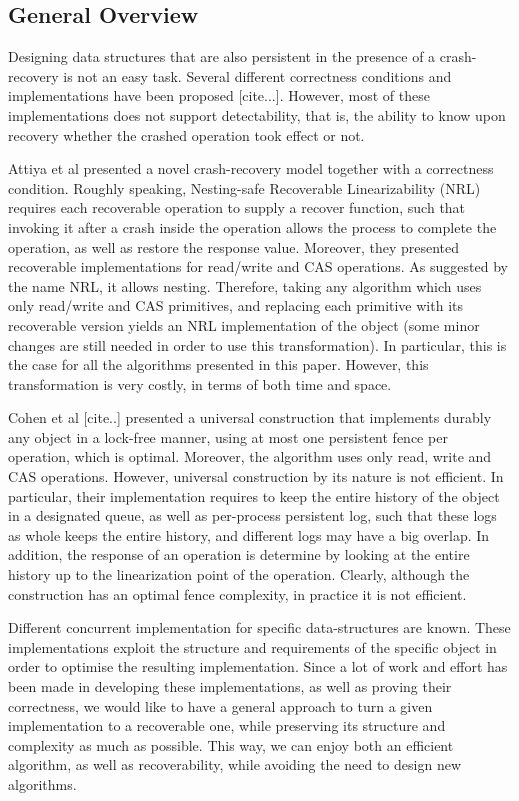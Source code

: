 \subsection{General Overview}
Designing data structures that are also persistent in the presence of a crash-recovery is not an easy task. Several different correctness conditions and implementations have been proposed [cite...]. However, most of these implementations does not support detectability, that is, the ability to know upon recovery whether the crashed operation took effect or not.

Attiya et al presented a novel crash-recovery model together with a correctness condition. Roughly speaking, Nesting-safe Recoverable Linearizability (NRL) requires each recoverable operation to supply a recover function, such that invoking it after a crash inside the operation allows the process to complete the operation, as well as restore the response value. Moreover, they presented recoverable implementations for read/write and CAS operations. As suggested by the name NRL, it allows nesting. Therefore, taking any algorithm which uses only read/write and CAS primitives, and replacing each primitive with its recoverable version yields an NRL implementation of the object (some minor changes are still needed in order to use this transformation). In particular, this is the case for all the algorithms presented in this paper. However, this transformation is very costly, in terms of both time and space.

Cohen et al [cite..] presented a universal construction that implements durably any object in a lock-free manner, using at most one persistent fence per operation, which is optimal. Moreover, the algorithm uses only read, write and CAS operations. However, universal construction by its nature is not efficient. In particular, their implementation requires to keep the entire history of the object in a designated queue, as well as per-process persistent log, such that these logs as whole keeps the entire history, and different logs may have a big overlap. In addition, the response of an operation is determine by looking at the entire history up to the linearization point of the operation. Clearly, although the construction has an optimal fence complexity, in practice it is not efficient.

Different concurrent implementation for specific data-structures are known. These implementations exploit the structure and requirements of the specific object in order to optimise the resulting implementation. Since a lot of work and effort has been made in developing these implementations, as well as proving their correctness, we would like to have a general approach to turn a given implementation to a recoverable one, while preserving its structure and complexity as much as possible. This way, we can enjoy both an efficient algorithm, as well as recoverability, while avoiding the need to design new algorithms.


